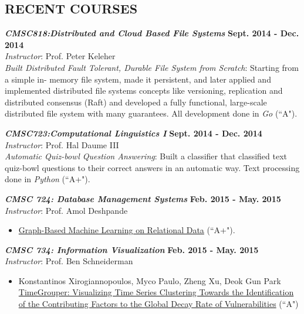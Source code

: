 \documentclass[margin, 10pt]{res} %
\begin{document}
\begin{resume}

\section{RECENT COURSES}

{\sl \textbf{CMSC818:Distributed and Cloud Based File Systems}} \hfill \textbf{Sept. 2014 - Dec. 2014}\\
\textit{Instructor}: Prof. Peter Keleher\\
\textit{Built Distributed Fault Tolerant, Durable File System from Scratch}: Starting from a simple in- memory file system, made it persistent, and later applied and implemented distributed file systems concepts like versioning, replication and distributed consensus (Raft) and developed a fully functional, large-scale distributed file system with many guarantees. All development done in \textit{Go} (``A").

{\sl \textbf{CMSC723:Computational Linguistics I}} \hfill \textbf{Sept. 2014 - Dec. 2014}\\
\textit{Instructor}: Prof. Hal Daume III\\
\textit{Automatic Quiz-bowl Question Answering}: Built a classifier that classified text quiz-bowl questions to their correct answers in an automatic way. Text processing done in \textit{Python} (``A+").

{\sl \textbf{CMSC 724: Database Management Systems}} \hfill \textbf{Feb. 2015 - May. 2015}\\
\textit{Instructor}: Prof. Amol Deshpande\\
\begin{itemize}
  \item \href{https://drive.google.com/open?id=0B20MIwp_I7FlUGhyVmFYcjFuYmM}{Graph-Based Machine Learning on Relational Data} (``A+").
\end{itemize}

{\sl \textbf{CMSC 734: Information Visualization}} \hfill \textbf{Feb. 2015 - May. 2015}\\
\textit{Instructor}: Prof. Ben Schneiderman\\
\begin{itemize}
  \item Konstantinos Xirogiannopoulos, Myco Paulo, Zheng Xu, Deok Gun Park\\
  \href{https://wiki.cs.umd.edu/cmsc734_s15/images/f/fc/TimeGrouper_FinalReport.pdf}{TimeGrouper: Visualizing Time Series Clustering Towards the Identification of the Contributing Factors to the Global Decay Rate of Vulnerabilities} (``A")
\end{itemize}



\end{resume}
\end{document}
